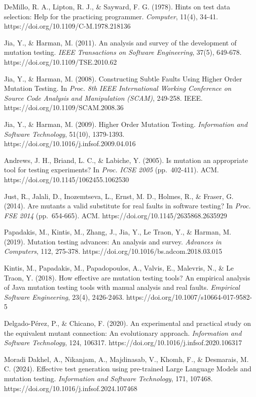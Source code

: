 \documentclass[review,12pt,authoryear]{elsarticle}
\begin{document}
DeMillo, R. A., Lipton, R. J., \& Sayward, F. G. (1978). Hints on test
data selection: Help for the practicing programmer. \emph{Computer},
11(4), 34-41. https://doi.org/10.1109/C-M.1978.218136

Jia, Y., \& Harman, M. (2011). An analysis and survey of the development
of mutation testing. \emph{IEEE Transactions on Software Engineering},
37(5), 649-678. https://doi.org/10.1109/TSE.2010.62

Jia, Y., \& Harman, M. (2008). Constructing Subtle Faults Using Higher
Order Mutation Testing. In \emph{Proc. 8th IEEE International Working
Conference on Source Code Analysis and Manipulation (SCAM)}, 249-258.
IEEE. https://doi.org/10.1109/SCAM.2008.36

Jia, Y., \& Harman, M. (2009). Higher Order Mutation Testing.
\emph{Information and Software Technology}, 51(10), 1379-1393.
https://doi.org/10.1016/j.infsof.2009.04.016

Andrews, J. H., Briand, L. C., \& Labiche, Y. (2005). Is mutation an
appropriate tool for testing experiments? In \emph{Proc. ICSE 2005}
(pp.~402-411). ACM. https://doi.org/10.1145/1062455.1062530

Just, R., Jalali, D., Inozemtseva, L., Ernst, M. D., Holmes, R., \&
Fraser, G. (2014). Are mutants a valid substitute for real faults in
software testing? In \emph{Proc. FSE 2014} (pp.~654-665). ACM.
https://doi.org/10.1145/2635868.2635929

Papadakis, M., Kintis, M., Zhang, J., Jia, Y., Le Traon, Y., \& Harman,
M. (2019). Mutation testing advances: An analysis and survey.
\emph{Advances in Computers}, 112, 275-378.
https://doi.org/10.1016/bs.adcom.2018.03.015

Kintis, M., Papadakis, M., Papadopoulos, A., Valvis, E., Malevris, N.,
\& Le Traon, Y. (2018). How effective are mutation testing tools? An
empirical analysis of Java mutation testing tools with manual analysis
and real faults. \emph{Empirical Software Engineering}, 23(4),
2426-2463. https://doi.org/10.1007/s10664-017-9582-5

Delgado-Pérez, P., \& Chicano, F. (2020). An experimental and practical
study on the equivalent mutant connection: An evolutionary approach.
\emph{Information and Software Technology}, 124, 106317.
https://doi.org/10.1016/j.infsof.2020.106317

Moradi Dakhel, A., Nikanjam, A., Majdinasab, V., Khomh, F., \&
Desmarais, M. C. (2024). Effective test generation using pre-trained
Large Language Models and mutation testing. \emph{Information and
Software Technology}, 171, 107468.
https://doi.org/10.1016/j.infsof.2024.107468
\end{document}
